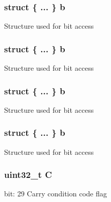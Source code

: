 \subsubsection[{\texorpdfstring{b}{b}}]{\setlength{\rightskip}{0pt plus 5cm}struct \{ ... \}   b}\hypertarget{unionx_p_s_r___type_a4ff200ad9067d3d0864a8465a92eb7d6}{}\label{unionx_p_s_r___type_a4ff200ad9067d3d0864a8465a92eb7d6}
Structure used for bit access 
\subsubsection[{\texorpdfstring{b}{b}}]{\setlength{\rightskip}{0pt plus 5cm}struct \{ ... \}   b}\hypertarget{unionx_p_s_r___type_ac2a9a795ab2663b586a1a69f90b3354d}{}\label{unionx_p_s_r___type_ac2a9a795ab2663b586a1a69f90b3354d}
Structure used for bit access 
\subsubsection[{\texorpdfstring{b}{b}}]{\setlength{\rightskip}{0pt plus 5cm}struct \{ ... \}   b}\hypertarget{unionx_p_s_r___type_a979a7d3a363140b150617a8c5a295e76}{}\label{unionx_p_s_r___type_a979a7d3a363140b150617a8c5a295e76}
Structure used for bit access 
\subsubsection[{\texorpdfstring{b}{b}}]{\setlength{\rightskip}{0pt plus 5cm}struct \{ ... \}   b}\hypertarget{unionx_p_s_r___type_a5443dc0839f42341fa2e2e52d9cf1ebb}{}\label{unionx_p_s_r___type_a5443dc0839f42341fa2e2e52d9cf1ebb}
Structure used for bit access 
\subsubsection[{\texorpdfstring{C}{C}}]{\setlength{\rightskip}{0pt plus 5cm}uint32\+\_\+t C}\hypertarget{unionx_p_s_r___type_a7a1caf92f32fe9ebd8d1fe89b06c7776}{}\label{unionx_p_s_r___type_a7a1caf92f32fe9ebd8d1fe89b06c7776}
bit\+: 29 Carry condition code flag 

